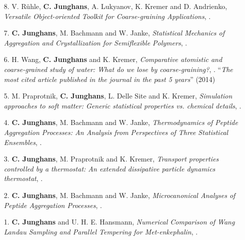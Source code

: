 \documentclass{article}
\begin{document}
\begin{enumerate}
\item[8.] V. R{\"u}hle, \textbf{C. Junghans}, A. Lukyanov, K. Kremer and D. Andrienko,
  \textit{Versatile Object-oriented Toolkit for Coarse-graining Applications},
  . 

\item[7.] \textbf{C. Junghans}, M. Bachmann and W. Janke,
  \textit{Statistical Mechanics of Aggregation and Crystallization for Semiflexible Polymers},
  .

\item[6.] H. Wang, \textbf{C. Junghans} and K. Kremer,
  \textit{Comparative atomistic and coarse-grained study of water: What do we lose by coarse-graining?},
  . 
  ``\emph{The most cited article published in the journal in the past 5 years}'' (2014)

\item[5.] M. Praprotnik, \textbf{C. Junghans}, L. Delle Site and K. Kremer,
  \textit{Simulation approaches to soft matter: Generic statistical properties vs. chemical details},
  .

\item[4.] \textbf{C. Junghans}, M. Bachmann and W. Janke,
  \textit{Thermodynamics of Peptide Aggregation Processes: An Analysis from Perspectives of Three Statistical Ensembles},
   .

\item[3.] \textbf{C. Junghans}, M. Praprotnik and K. Kremer,
  \textit{Transport properties controlled by a thermostat: An extended dissipative particle dynamics thermostat},
  .

\item[2.] \textbf{C. Junghans}, M. Bachmann and W. Janke,
  \textit{Microcanonical Analyses of Peptide Aggregation Processes},
  .

\item[1.] \textbf{C. Junghans} and U. H. E. Hansmann,
  \textit{Numerical Comparison of Wang Landau Sampling and Parallel Tempering for Met-enkephalin}, 
  .
\end{enumerate}
\end{document}

